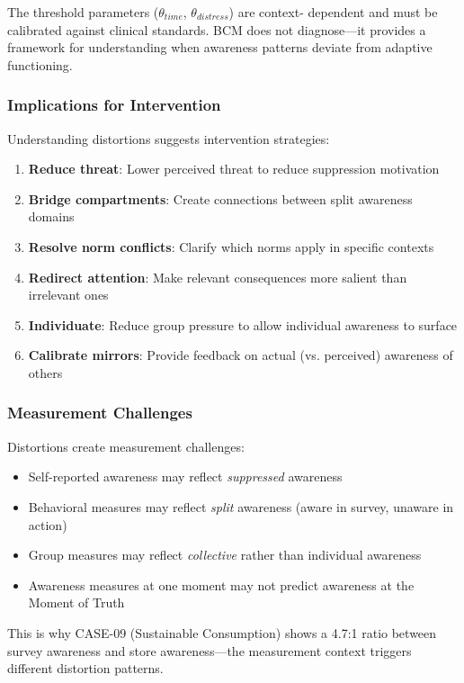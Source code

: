 The threshold parameters ($\theta_{time}$, $\theta_{distress}$) are context-
dependent and must be calibrated against clinical standards. BCM does not 
diagnose—it provides a framework for understanding when awareness patterns 
deviate from adaptive functioning.

\subsubsection{Implications for Intervention}

Understanding distortions suggests intervention strategies:

\begin{enumerate}
    \item \textbf{Reduce threat}: Lower perceived threat to reduce 
          suppression motivation
    \item \textbf{Bridge compartments}: Create connections between 
          split awareness domains
    \item \textbf{Resolve norm conflicts}: Clarify which norms apply 
          in specific contexts
    \item \textbf{Redirect attention}: Make relevant consequences 
          more salient than irrelevant ones
    \item \textbf{Individuate}: Reduce group pressure to allow 
          individual awareness to surface
    \item \textbf{Calibrate mirrors}: Provide feedback on actual 
          (vs. perceived) awareness of others
\end{enumerate}

\subsubsection{Measurement Challenges}

Distortions create measurement challenges:
\begin{itemize}
    \item Self-reported awareness may reflect \emph{suppressed} awareness
    \item Behavioral measures may reflect \emph{split} awareness 
          (aware in survey, unaware in action)
    \item Group measures may reflect \emph{collective} rather than 
          individual awareness
    \item Awareness measures at one moment may not predict awareness 
          at the Moment of Truth
\end{itemize}

This is why CASE-09 (Sustainable Consumption) shows a 4.7:1 ratio between 
survey awareness and store awareness—the measurement context triggers 
different distortion patterns.
